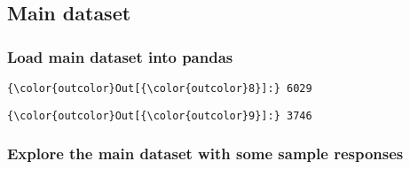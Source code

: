 \documentclass[11pt]{article}
\begin{document}
\subsection{Main dataset}\label{main-dataset}

    \subsubsection{Load main dataset into
pandas}\label{load-main-dataset-into-pandas}




            \begin{Verbatim}[commandchars=\\\{\}]
{\color{outcolor}Out[{\color{outcolor}8}]:} 6029
\end{Verbatim}
        

            \begin{Verbatim}[commandchars=\\\{\}]
{\color{outcolor}Out[{\color{outcolor}9}]:} 3746
\end{Verbatim}
        
    \subsubsection{Explore the main dataset with some sample
responses}\label{explore-the-main-dataset-with-some-sample-responses}
\end{document}
